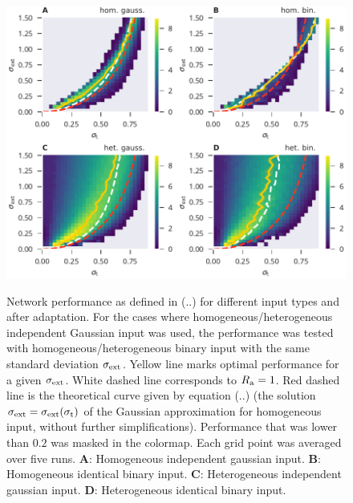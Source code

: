 \documentclass[12pt]{article}
\begin{document}
  \begin{figure}
    \includegraphics[width=5.78in]{./performance_sweep_composite.pdf}
    \label{fig:xor_perf_sweep}
    \caption{ Network performance as defined in (..) for different input types and after adaptation. For the cases where homogeneous/heterogeneous independent Gaussian input was used, the performance was tested with homogeneous/heterogeneous binary input with the same standard deviation $\sigma_{\rm ext}$. Yellow line marks optimal performance for a given $\sigma_{\rm ext}$. White dashed line corresponds to $R_{\rm a} = 1$. Red dashed line is the theoretical curve given by equation (..) (the solution $\sigma_{\rm ext} = \sigma_{\rm ext}(\sigma_{\rm t})$ of the Gaussian approximation for homogeneous input, without further simplifications). Performance that was lower than $0.2$ was masked in the colormap. Each grid point was averaged over five runs.
    {\bf A}: Homogeneous independent gaussian input.
     {\bf B}: Homogeneous identical binary input. 
     {\bf C}: Heterogeneous independent gaussian input. 
     {\bf D}: Heterogeneous identical binary input.}
  \end{figure}
\end{document}
